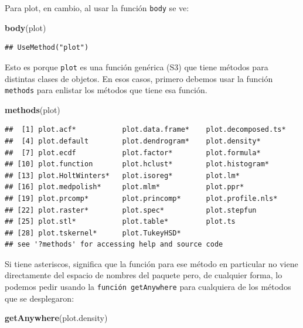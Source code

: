 \documentclass[]{article}
\newenvironment{Shaded}{\begin{snugshade}}{\end{snugshade}}
\newcommand{\KeywordTok}[1]{\textcolor[rgb]{0.13,0.29,0.53}{\textbf{#1}}}
\newcommand{\NormalTok}[1]{#1}
\begin{document}
Para plot, en cambio, al usar la función \texttt{body} se ve:

\begin{Shaded}
\begin{Highlighting}[]
\KeywordTok{body}\NormalTok{(plot)}
\end{Highlighting}
\end{Shaded}

\begin{verbatim}
## UseMethod("plot")
\end{verbatim}

Esto es porque \texttt{plot} es una función genérica (S3) que tiene
métodos para distintas clases de objetos. En esos casos, primero debemos
usar la función \texttt{methods} para enlistar los métodos que tiene esa
función.

\begin{Shaded}
\begin{Highlighting}[]
\KeywordTok{methods}\NormalTok{(plot)}
\end{Highlighting}
\end{Shaded}

\begin{verbatim}
##  [1] plot.acf*           plot.data.frame*    plot.decomposed.ts*
##  [4] plot.default        plot.dendrogram*    plot.density*      
##  [7] plot.ecdf           plot.factor*        plot.formula*      
## [10] plot.function       plot.hclust*        plot.histogram*    
## [13] plot.HoltWinters*   plot.isoreg*        plot.lm*           
## [16] plot.medpolish*     plot.mlm*           plot.ppr*          
## [19] plot.prcomp*        plot.princomp*      plot.profile.nls*  
## [22] plot.raster*        plot.spec*          plot.stepfun       
## [25] plot.stl*           plot.table*         plot.ts            
## [28] plot.tskernel*      plot.TukeyHSD*     
## see '?methods' for accessing help and source code
\end{verbatim}

Si tiene asteriscos, significa que la función para ese método en
particular no viene directamente del espacio de nombres del paquete
pero, de cualquier forma, lo podemos pedir usando la
\texttt{función\ getAnywhere} para cualquiera de los métodos que se
desplegaron:

\begin{Shaded}
\begin{Highlighting}[]
\KeywordTok{getAnywhere}\NormalTok{(plot.density)}
\end{Highlighting}
\end{Shaded}
\end{document}
